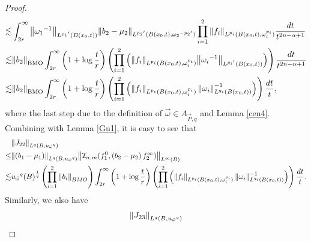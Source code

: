 \documentclass[11pt, twoside, leqno]{article}
\begin{document}
\begin{proof}[Proof]
\begin{align}
	\lesssim&\int_{2r}^\infty  {{{\left\| {{\omega _1}^{ - 1}} \right\|}_{{L^{{p_1}^\prime }}(B\left( {{x_0},t} \right))}}{{\left\| {{b_2} - {\mu _2}} \right\|}_{{L^{{p_2}^\prime }}(B\left( {{x_0},t} \right),{\omega _2}^{ - {p_2}^\prime })}}\prod\limits_{i = 1}^2 {{{\left\| {{f_i}} \right\|}_{{L^{{p_i}}}(B\left( {{x_0},t} \right),\omega _i^{{p_i}})}}} \frac{{dt}}{{{t^{2n - \alpha  + 1}}}}}\notag\\
	\lesssim& {{{\left\| {{b_2}} \right\|}_{\rm BMO}}} \int_{2r}^\infty  {\left( {1 + \log \frac{t}{r}} \right)\left( {\prod\limits_{i = 1}^2 {\left( {{{\left\| {{f_i}} \right\|}_{{L^{{p_i}}}(B\left( {{x_0},t} \right),\omega _i^{{p_i}})}}{{\left\| {{\omega _i}^{ - 1}} \right\|}_{{L^{{p_i}^\prime }}(B\left( {{x_0},t} \right))}}} \right)} } \right)\frac{{dt}}{{{t^{2n - \alpha  + 1}}}}}\notag\\
	\lesssim&{\left\| {{b_2}} \right\|_{\rm BMO}}\int_{2r}^\infty  {\left( {1 + \log \frac{t}{r}} \right)\left( {\prod\limits_{i = 1}^2 {\left( {{{\left\| {{f_i}} \right\|}_{{L^{{p_i}}}(B\left( {{x_0},t} \right),\omega _i^{{p_i}})}}\left\| {{\omega _i}} \right\|_{{L^{{q_i}}}(B\left( {{x_0},t} \right))}^{ - 1}} \right)} } \right)\frac{{dt}}{t}},
	\end{align}
	where the last step due to the definition of $\vec{\omega} \in {A_{\vec P,q}}$ and Lemma \ref{cen4}.
	Combining with Lemma \ref{Gu1}, it is easy to see that
	\begin{align}\label{eq3.10}
	&{\left\| {{J_{22}}} \right\|_{{L^q}\left( {B,{u_{\vec \omega }}^q} \right)}}\notag\\
	\le&{\left\| {\left( {{b_1} - {\mu _1}} \right)} \right\|_{{L^q}\left( {B,{u_{\vec \omega }}^q} \right)}}{\left\| {{\mathcal I}_{\alpha,m}(f_1^0,\left( {{b_2} - {\mu _2}} \right)f_2^\infty )} \right\|_{{L^\infty }\left( B \right)}}\notag\\
	\lesssim&{u_{\vec \omega }}^q{\left( B \right)^{\frac{1}{q}}}\left( {\prod\limits_{i = 1}^2 {{{\left\| {{b_i}} \right\|}_{BMO}}} } \right)\int_{2r}^\infty  {\left( {1 + \log \frac{t}{r}} \right)\left( {\prod\limits_{i = 1}^2 {\left( {{{\left\| {{f_i}} \right\|}_{{L^{{p_i}}}(B\left( {{x_0},t} \right),\omega _i^{{p_i}})}}\left\| {{\omega _i}} \right\|_{{L^{{q_i}}}(B\left( {{x_0},t} \right))}^{ - 1}} \right)} } \right)\frac{{dt}}{t}}.
	\end{align}
	Similarly, we also have
	\begin{align}\label{eq3.11}
	&{\left\| {{J_{23}}} \right\|_{{L^q}\left( {B,{u_{\vec \omega }}^q} \right)}}\notag\\

\end{align}
\end{proof}
\end{document}
